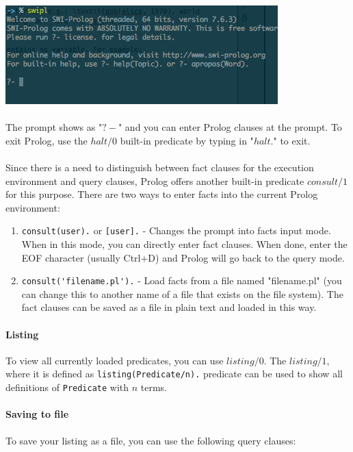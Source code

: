 \documentclass{article}
\begin{document}
\begin{multicols}{2}
  \noindent \includegraphics[scale=0.55]{terminal.png}
  
  \paragraph{} The prompt shows as "$?-$" and you can enter Prolog clauses at the prompt. To exit Prolog, use the $halt/0$ built-in predicate by typing in "$halt.$" to exit.
  
  \paragraph{} Since there is a need to distinguish between fact clauses for the execution environment and query clauses, Prolog offers another built-in predicate $consult/1$ for this purpose. There are two ways to enter facts into the current Prolog environment:
  
  \begin{enumerate}
  \item \lstinline{consult(user).} or \lstinline{[user].} - Changes the prompt into facts input mode. When in this mode, you can directly enter fact clauses. When done, enter the EOF character (usually Ctrl+D) and Prolog will go back to the query mode.
  \item \lstinline{consult('filename.pl').} - Load facts from a file named "filename.pl" (you can change this to another name of a file that exists on the file system). The fact clauses can be saved as a file in plain text and loaded in this way.
  \end{enumerate}
  
  \paragraph{Listing} To view all currently loaded predicates, you can use $listing/0$. The $listing/1$, where it is defined as \lstinline{listing(Predicate/n).} predicate can be used to show all definitions of \lstinline{Predicate} with $n$ terms.
  
  \paragraph{Saving to file} To save your listing as a file, you can use the following query clauses:
  

\end{multicols}
\end{document}
